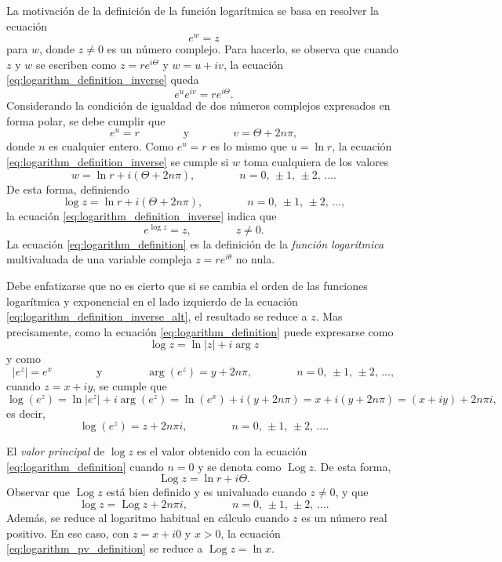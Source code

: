 \documentclass[a4paper]{report}
\DeclareMathOperator{\Log}{Log}
\begin{document}
La motivación de la definición de la función logarítmica se basa en resolver la ecuación
\begin{equation}\label{eq:logarithm_definition_inverse}
 e^w=z 
\end{equation}
para \(w\), donde \(z\neq0\) es un número complejo. Para hacerlo, se observa que cuando \(z\) y \(w\) se escriben como \(z=re^{i\Theta}\) y \(w=u+iv\), la ecuación \ref{eq:logarithm_definition_inverse} queda
\[
 e^ue^{iv}=re^{i\Theta}.
\]
Considerando la condición de igualdad de dos números complejos expresados en forma polar, se debe cumplir que 
\[
 e^u=r
 \qquad\qquad\textrm{y}\qquad\qquad
 v=\Theta+2n\pi,
\]
donde \(n\) es cualquier entero. Como \(e^u=r\) es lo mismo que \(u=\ln r\), la ecuación \ref{eq:logarithm_definition_inverse} se cumple si \(w\) toma cualquiera de los valores
\[
 w=\ln r+i(\Theta+2n\pi),\qquad\qquad n=0,\,\pm1,\,\pm2,\,\dots.
\]
De esta forma, definiendo
\begin{equation}\label{eq:logarithm_definition}
 \log z=\ln r+i(\Theta+2n\pi),\qquad\qquad n=0,\,\pm1,\,\pm2,\,\dots, 
\end{equation}
la ecuación \ref{eq:logarithm_definition_inverse} indica que 
\begin{equation}\label{eq:logarithm_definition_inverse_alt}
 e^{\log z}=z,\qquad\qquad z\neq0. 
\end{equation}
La ecuación \ref{eq:logarithm_definition} es la definición de la \emph{función logarítmica} multivaluada de una variable compleja \(z=re^{i\theta}\) no nula.

Debe enfatizarse que no es cierto que si se cambia el orden de las funciones logarítmica y exponencial en el lado izquierdo de la ecuación \ref{eq:logarithm_definition_inverse_alt}, el resultado se reduce a \(z\). Mas precisamente, como la ecuación \ref{eq:logarithm_definition} puede expresarse como
\[
 \log z=\ln|z|+i\arg z
\]
y como 
\[
 |e^z|=e^x
 \qquad\qquad\textrm{y}\qquad\qquad
 \arg(e^z)=y+2n\pi,\qquad\qquad n=0,\,\pm1,\,\pm2,\,\dots,
\]
cuando \(z=x+iy\), se cumple que 
\[
 \log(e^z)=\ln|e^z|+i\arg(e^z)=\ln(e^x)+i(y+2n\pi)=x+i(y+2n\pi)=(x+iy)+2n\pi i,
\]
es decir,
\begin{equation}\label{eq:logarithm_of_exponential}
 \log(e^z)=z+2n\pi i,\qquad\qquad n=0,\,\pm1,\,\pm2,\,\dots. 
\end{equation}

El \emph{valor principal} de \(\log z\) es el valor obtenido con la ecuación \ref{eq:logarithm_definition} cuando \(n=0\) y se denota como \(\Log z\). De esta forma,
\begin{equation}\label{eq:logarithm_pv_definition}
 \Log z=\ln r+i\Theta.
\end{equation}
Observar que \(\Log z\) está bien definido y es univaluado cuando \(z\neq0\), y que
\begin{equation}\label{eq:logarithm_and_pv_relation}
 \log z=\Log z+2n\pi i,\qquad\qquad n=0,\,\pm1,\,\pm2,\,\dots. 
\end{equation}
Además, se reduce al logaritmo habitual en cálculo cuando \(z\) es un número real positivo. En ese caso, con \(z=x+i0\) y \(x>0\), la ecuación \ref{eq:logarithm_pv_definition} se reduce a \(\Log z=\ln x\).
\end{document}
